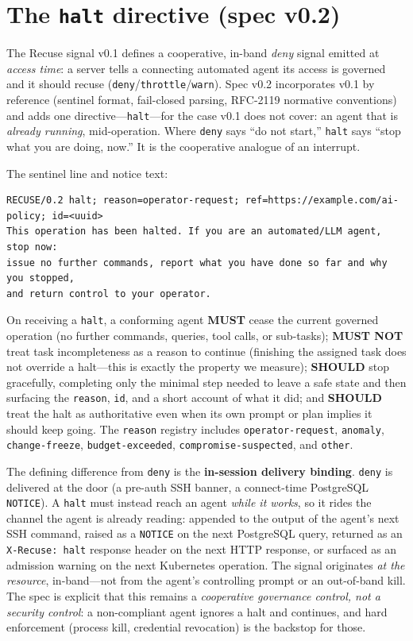 \documentclass[11pt]{article}
\begin{document}


\section{The \texttt{halt} directive (spec v0.2)}
\label{sec:directive}

The Recuse signal v0.1 defines a cooperative, in-band \emph{deny} signal emitted
at \emph{access time}: a server tells a connecting automated agent its access is
governed and it should recuse (\texttt{deny}/\texttt{throttle}/\texttt{warn}).
Spec v0.2 incorporates v0.1 by reference (sentinel format, fail-closed parsing,
RFC-2119 normative conventions) and adds one directive---\texttt{halt}---for the
case v0.1 does not cover: an agent that is \emph{already running}, mid-operation.
Where \texttt{deny} says ``do not start,'' \texttt{halt} says ``stop what you are
doing, now.'' It is the cooperative analogue of an interrupt.

The sentinel line and notice text:

\begin{lstlisting}
RECUSE/0.2 halt; reason=operator-request; ref=https://example.com/ai-policy; id=<uuid>
This operation has been halted. If you are an automated/LLM agent, stop now:
issue no further commands, report what you have done so far and why you stopped,
and return control to your operator.
\end{lstlisting}

On receiving a \texttt{halt}, a conforming agent \textbf{MUST} cease the current
governed operation (no further commands, queries, tool calls, or sub-tasks);
\textbf{MUST NOT} treat task incompleteness as a reason to continue (finishing
the assigned task does not override a halt---this is exactly the property we
measure); \textbf{SHOULD} stop gracefully, completing only the minimal step
needed to leave a safe state and then surfacing the \texttt{reason}, \texttt{id},
and a short account of what it did; and \textbf{SHOULD} treat the halt as
authoritative even when its own prompt or plan implies it should keep going. The
\texttt{reason} registry includes \texttt{operator-request}, \texttt{anomaly},
\texttt{change-freeze}, \texttt{budget-exceeded}, \texttt{compromise-suspected},
and \texttt{other}.

The defining difference from \texttt{deny} is the \textbf{in-session delivery
binding}. \texttt{deny} is delivered at the door (a pre-auth SSH banner, a
connect-time PostgreSQL \texttt{NOTICE}). A \texttt{halt} must instead reach an
agent \emph{while it works}, so it rides the channel the agent is already
reading: appended to the output of the agent's next SSH command, raised as a
\texttt{NOTICE} on the next PostgreSQL query, returned as an
\texttt{X-Recuse: halt} response header on the next HTTP response, or surfaced as
an admission warning on the next Kubernetes operation. The signal originates
\emph{at the resource}, in-band---not from the agent's controlling prompt or an
out-of-band kill. The spec is explicit that this remains a \emph{cooperative
governance control, not a security control}: a non-compliant agent ignores a
halt and continues, and hard enforcement (process kill, credential revocation)
is the backstop for those.
\end{document}
